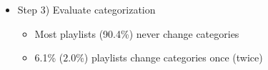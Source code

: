 \documentclass[8pt]{beamer}
\begin{document}
\begin{frame}
\begin{itemize}
\begin{itemize}
\begin{itemize}
          \end{itemize}
          \item[$\rightarrow$] Step 3) Evaluate categorization
          \begin{itemize}
            \item Most playlists (90.4\%) never change categories
            \item 6.1\% ($2.0\%$) playlists change categories once (twice)
          \end{itemize}

       \end{itemize}
   
   \end{itemize}
     
\end{frame}
   

\end{document}
